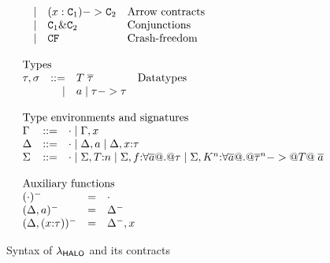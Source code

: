 \begin{figure}
\[\begin{array}{l}
\begin{array}{lrll}
     & \mid &  (x : \Ct_1) -> \Ct_2      & \text{Arrow contracts} \\
     & \mid & \Ct_1 \& \Ct_2             & \text{Conjunctions}   \\
     & \mid & \CF                        & \text{Crash-freedom}   \\
\end{array}
\\ \\
\begin{array}{lrll}
\multicolumn{3}{l}{\text{Types}} \\
\tau,\sigma & ::=  & T\;\taus & \text{Datatypes} \\
            & \mid & a \mid \tau -> \tau
\end{array}
\\ \\
\begin{array}{lrll}
\multicolumn{3}{l}{\text{Type environments and signatures}} \\
\Gamma & ::=  & \cdot \mid \Gamma,x \\
\Delta & ::=  & \cdot \mid \Delta,a \mid \Delta,x{:}\tau \\
\Sigma & ::=  & \cdot \mid \Sigma,T{:}n \mid \Sigma,f{:}\forall\ol{a} @.@ \tau \mid \Sigma,K^{\ar}{:}\forall\ol{a} @.@ \oln{\tau}{\ar} -> @T@\;\as
\end{array}
\\ \\
\begin{array}{lrll}
\multicolumn{3}{l}{\text{Auxiliary functions}} \\
(\cdot)^{-}            & = & \cdot \\
(\Delta,a)^{-}         & = & \Delta^{-} \\
(\Delta,(x{:}\tau))^{-} & = & \Delta^{-},x
\end{array}
\end{array}\]
\caption{Syntax of $\lambda_{\sf HALO}$ and its contracts}\label{fig:syntax}
\end{figure}

